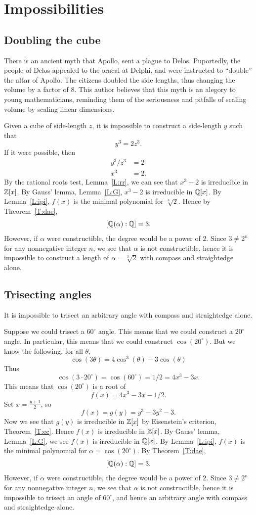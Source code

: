 \documentclass{ximera}
\begin{document}
\section{Impossibilities}

\subsection{Doubling the cube}

There is an ancient myth that Apollo, sent a plague to
Delos. Puportedly, the people of Delos appealed to the oracal at
Delphi, and were instructed to ``double'' the altar of Apollo. The
citizens doubled the side lengths, thus changing the volume by a
factor of $8$. This author believes that this myth is an alegory to
young mathematicians, reminding them of the seriousness and pitfalls
of scaling volume by scaling linear dimensions.


Given a cube of side-length $z$, it is impossible to construct a
side-length $y$ such that
\[
y^3 = 2 z^3.
\]
If it were possible, then
\begin{align*}
  y^3/z^3 &= 2\\
  x^3 &= 2.
\end{align*}
By the rational roots test, Lemma~\ref{L:rr}, we can see that $x^3-2$
is irreducible in $\mathbb Z[x]$. By Gauss' lemma, Lemma~\ref{L:G}, $x^3-2$
is irreducible in $\mathbb Q[x]$. By Lemma~\ref{L:ipi}, $f(x)$ is the minimal
polynomial for $\sqrt[3]{2}$. Hence by Theorem~\ref{T:dae},
\[
  [\mathbb Q(\alpha):\mathbb Q]=3.
\]
However, if $\alpha$ were constructible, the
degree would be a power of $2$. Since $3\ne 2^n$ for any nonnegative
integer $n$, we see that $\alpha$ is not constructible, hence it is
impossible to construct a length of $\alpha = \sqrt[3]{2}$ with
compass and straightedge alone.



\subsection{Trisecting angles}

It is impossible to trisect an arbitrary angle with compass and
straightedge alone.

Suppose we could trisect a $60^\circ$ angle. This means that we could
construct a $20^\circ$ angle. In particular, this means that we could
construct $\cos(20^\circ)$. But we know the following, for all $\theta$, 
\[
\cos(3\theta) =  4\cos^3(\theta) -3 \cos(\theta)
\]
Thus
\[
\cos(3\cdot20^\circ) = \cos(60^\circ) = 1/2 = 4x^3 -3x.
\]
This means that $\cos(20^\circ)$ is a root of
\[
f(x)=4x^3 -3x -1/2.
\]
Set $x = \frac{y+1}{2}$, so
\[
f(x) = g(y) = y^3-3y^2-3.
\]
Now we see that $g(y)$ is irreducible in $\mathbb Z[x]$ by Eisenstein's
criterion, Theorem~\ref{T:ec}. Hence $f(x)$ is irreducible in
$\mathbb Z[x]$. By Gauss' lemma, Lemma~\ref{L:G}, we see $f(x)$ is
irreducible in $\mathbb Q[x]$.  By Lemma~\ref{L:ipi}, $f(x)$ is the minimal
polynomial for $\alpha=\cos(20^\circ)$. By Theorem~\ref{T:dae},
\[
  [\mathbb Q(\alpha):\mathbb Q]=3.
\]
However, if $\alpha$ were constructible, the
degree would be a power of $2$. Since $3\ne 2^n$ for any nonnegative
integer $n$, we see that $\alpha$ is not constructible, hence it is
impossible to trisect an angle of $60^\circ$, and hence an arbitrary
angle with compass and straightedge alone.
\end{document}
